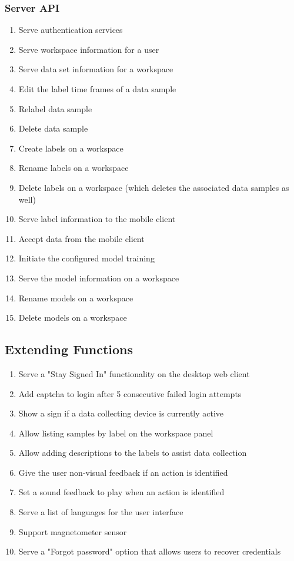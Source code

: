\subsubsection{Server API}
\begin{enumerate}[resume*]
    \item Serve authentication services
    \item Serve workspace information for a user
    \item Serve data set information for a workspace
    \item Edit the label time frames of a data sample
    \item Relabel data sample
    \item Delete data sample
    \item Create labels on a workspace
    \item Rename labels on a workspace
    \item Delete labels on a workspace (which deletes the associated data samples as well)
    \item Serve label information to the mobile client
    \item Accept data from the mobile client
    \item Initiate the configured model training
    \item Serve the model information on a workspace
    \item Rename models on a workspace
    \item Delete models on a workspace
\end{enumerate}

\subsection{Extending Functions}
\begin{enumerate}[resume*]
    \item Serve a "Stay Signed In" functionality on the desktop web client
    \item Add captcha to login after 5 consecutive failed login attempts
    \item Show a sign if a data collecting device is currently active
    \item Allow listing samples by label on the workspace panel
    \item Allow adding descriptions to the labels to assist data collection
    \item \label{/F480/} Give the user non-visual feedback if an action is identified
    \item Set a sound feedback to play when an action is identified
    \item Serve a list of languages for the user interface
    \item Support magnetometer sensor
    \item Serve a "Forgot password" option that allows users to recover credentials
\end{enumerate}